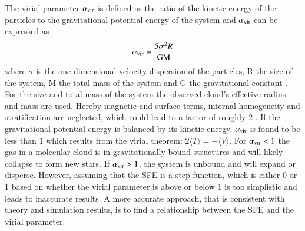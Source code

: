 \documentclass{aa}
\begin{document}
The virial parameter $\alpha_{\rm vir}$ is defined as the ratio of the kinetic energy of the particles to the gravitational potential energy of the system and $\alpha_{\rm vir}$ can be expressed as
\begin{equation}\label{eq:alpha1}
\alpha_{\rm vir} = \frac{5 \sigma^2 R}{\mathrm{G M}}
\end{equation}
where $\sigma$ is the one-dimensional velocity dispersion of the particles, R the size of the system, M the total mass of the system and G the gravitational constant \citep[e.g.][]{Evans_2022, McKee_1992}. For the size and total mass of the system the observed cloud's effective radius and mass are used. Hereby magnetic and surface terms, internal homogeneity and stratification are neglected, which could lead to a factor of roughly 2 \citep{Evans_2022}.
If the gravitational potential energy is balanced by its kinetic energy, $\alpha_{\rm vir}$ is found to be less than 1 which results from the virial theorem: $2 \langle T \rangle= -\langle V \rangle$. For $\alpha_{\rm vir}<1$ the gas in a molecular cloud is in gravitationally bound structures and will likely collapse to form new stars. If $\alpha_{\rm vir} > 1$, the system is unbound and will expand or disperse. However, assuming that the SFE is a step function, which is either 0 or 1 based on whether the virial parameter is above or below 1 is too simplistic and leads to inaccurate results. A more accurate approach, that is consistent with theory and simulation results, is to find a relationship between the SFE and the virial parameter. 
\end{document}
